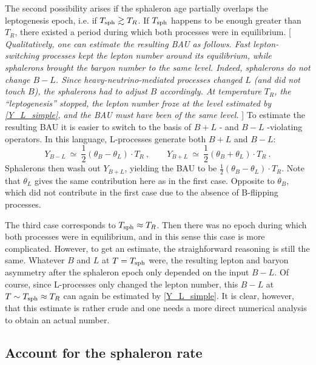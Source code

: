 \documentclass[12pt]{revtex4}
\newcommand{\Tsph}{T_{\rm sph}}
\begin{document}
	The second possibility arises if the sphaleron age partially
	overlaps the leptogenesis epoch, i.e. if $ \Tsph \gtrsim T_R $.
	If $ \Tsph $ happens to be enough greater than $ T_R $, there
	existed a period during which both processes were in equilibrium.
	[{\it
	Qualitatively, one can estimate the resulting BAU as follows.
	Fast lepton-switching processes kept the lepton number around
	its equilibrium, while sphalerons brought the baryon number to
	the same level.
	Indeed, sphalerons do not change $ B - L $. 
	Since heavy-neutrino-mediated processes changed $ L $ 
	(and did not touch $ B $), the sphalerons had to adjust $ B $ 
	accordingly. 
	At temperature $ T_R $, the ``leptogenesis'' stopped, 
	the lepton number froze at the level estimated by \eqref{Y_L_simple},
	and the BAU must have been of the same level. 
	}]
	To estimate the resulting BAU it is easier to switch to the
	basis of $ B + L $ - and $ B - L $ -violating operators.
	In this language, L-processes generate both  $ B + L $ and $ B - L $:
\[
	Y_{B-L} ~\simeq~ \frac 12 (\theta_B - \theta_L ) \cdot T_R~,\qquad
	Y_{B+L} ~\simeq~ \frac 12 (\theta_B + \theta_L ) \cdot T_R~.
\]	
	Sphalerons then wash out $ Y_{B+L} $, yielding the BAU to be
	$ \frac 12 (\theta_B - \theta_L ) \cdot T_R $.
	Note that $ \theta_L $ gives the same contribution here as in the 
	first case.
	Opposite to $ \theta_B $, which did not contribute in the first case
	due to the absence of B-flipping processes.
	
	The third case corresponds to $ \Tsph \approx T_R $.
	Then there was no epoch during which both processes
	were in equilibrium, and in this sense this case is more complicated.
	However, to get an estimate, the straighforward reasoning is
	still the same.
	Whatever $ B $ and $ L $ at $ T = \Tsph $ were, the resulting
	lepton and baryon asymmetry after the sphaleron epoch only
	depended on the input $ B - L $.
	Of course, since L-processes only changed the lepton number,
	this $ B - L $ at  $ T \sim \Tsph \approx T_R $ can 
	again be estimated by \eqref{Y_L_simple}.
	It is clear, however, that this estimate is rather crude and 
	one needs a more direct numerical analysis to obtain an actual
	number.
	

\subsection{Account for the sphaleron rate}
\end{document}
